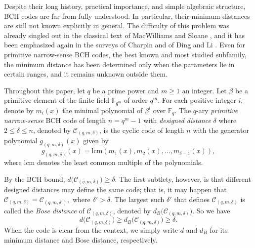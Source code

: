 \documentclass[journal,onecolumn]{IEEEtran}
\newcommand{\F}{\mathbb{F}}
\begin{document}
Despite their long history, practical importance, and simple algebraic structure, BCH codes are far from fully understood. In particular, their minimum distances are still not known explicitly in general. The
difficulty of this problem was already singled out in the classical text of MacWilliams and Sloane \cite[Ch.~9]{MacWilliamsSloane1977}, and it has been
emphasized again in the surveys of Charpin \cite{Charpin1998} and of Ding and
Li \cite{DingLi2024}. Even for primitive narrow-sense BCH codes, the best known and most studied
subfamily, the minimum distance has been determined only when the parameters lie in certain ranges, and it remains unknown outside them.


Throughout this paper, 
let $q$ be a prime power and $m\geq 1$ an integer. Let $\beta$ be a primitive element of the finite field $\F_{q^m}$ of order $q^m$. For each positive integer $i$, denote by $m_{i}(x)$ the minimal polynomial of $\beta^i$ over $\F_q$. The $q$-ary \emph{primitive narrow-sense}
BCH code of length $n=q^m-1$ with \emph{designed distance} $\delta $ where $2\leq \delta \le n$, denoted by 
$\mathcal{C}_{(q,m,\delta)}$, is the cyclic code of length $n$ with the generator polynomial $g_{(q,m,\delta)}(x)$ given by 
\begin{equation*}
    g_{(q,m,\delta)}(x)=\mathrm{lcm}\left(m_{1}(x), m_{2}(x),\ldots,m_{\delta-1}(x)\right), 
    \end{equation*}
where  $\mathrm{lcm}$ denotes the least common multiple of the polynomials.  

By the BCH bound, $d\bigl(\mathcal{C}_{(q,m,\delta)}\bigr)\geq \delta$. The first subtlety, however, is that different designed distances may define the same code; that is, it may happen that
$
  \mathcal{C}_{(q,m,\delta)}
  =\mathcal{C}_{(q,m,\delta')},
  $
where $\delta' > \delta$. The largest such $\delta'$ that defines $\mathcal{C}_{(q,m,\delta)}$ is called the \emph{Bose distance} of $\mathcal{C}_{(q,m,\delta)}$, denoted by $d_B\bigl(\mathcal{C}_{(q,m,\delta)}\bigr)$. So we have
\begin{equation*}
  d\bigl(\mathcal{C}_{(q,m,\delta)}\bigr)
  \geq d_B\bigl(\mathcal{C}_{(q,m,\delta)}\bigr)
  \geq \delta.
\end{equation*}
When the code is clear from the context, we simply write $d$ and $d_B$ for
its minimum distance and Bose distance, respectively.
\end{document}
